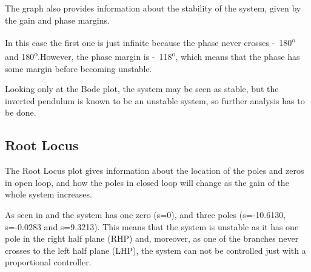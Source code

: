 The graph also provides information about the stability of the system, given by the gain and phase margins. 

In this case the first one is just infinite because the phase never crosses \si{-180^o} and \si{180^o}.However, the phase margin is \si{-118^o}, which means that the phase has some margin before becoming unstable.

Looking only at the Bode plot, the system may be seen as stable, but the inverted pendulum is known to be an unstable system, so further analysis has to be done.

\subsection{Root Locus}
The Root Locus plot gives information about the location of the poles and zeros in open loop, and how the poles in closed loop will change as the gain of the whole system increases.

As seen in  and  the system has one zero (s=0), and three poles (s=-10.6130, s=-0.0283 and s=9.3213). This means that the system is unstable as it has one pole in the right half plane (RHP) and, moreover, as one of the branches never crosses to the left half plane (LHP), the system can not be controlled just with a proportional controller.

